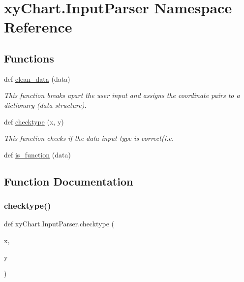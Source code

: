 \hypertarget{namespacexy_chart_1_1_input_parser}{}\section{xy\+Chart.\+Input\+Parser Namespace Reference}
\label{namespacexy_chart_1_1_input_parser}
\subsection*{Functions}
\begin{DoxyCompactItemize}
\item 
def \hyperlink{namespacexy_chart_1_1_input_parser_a191949c9ebdf33fe93b75b8a82f222e5}{clean\+\_\+data} (data)
\begin{DoxyCompactList}\small\item\em This function breaks apart the user input and assigns the coordinate pairs to a dictionary (data structure). \end{DoxyCompactList}\item 
def \hyperlink{namespacexy_chart_1_1_input_parser_ad26c1f522837c6f85672237307b04239}{checktype} (x, y)
\begin{DoxyCompactList}\small\item\em This function checks if the data input type is correct(i.\+e. \end{DoxyCompactList}\item 
def \hyperlink{namespacexy_chart_1_1_input_parser_adc18d7c46d4d8a5efd5a5fa8e9c04fe2}{is\+\_\+function} (data)
\end{DoxyCompactItemize}


\subsection{Function Documentation}
\hypertarget{namespacexy_chart_1_1_input_parser_ad26c1f522837c6f85672237307b04239}{}\label{namespacexy_chart_1_1_input_parser_ad26c1f522837c6f85672237307b04239} 
\subsubsection{\texorpdfstring{checktype()}{checktype()}}
{\footnotesize\ttfamily def xy\+Chart.\+Input\+Parser.\+checktype (\begin{DoxyParamCaption}\item[{}]{x,  }\item[{}]{y }\end{DoxyParamCaption})}



